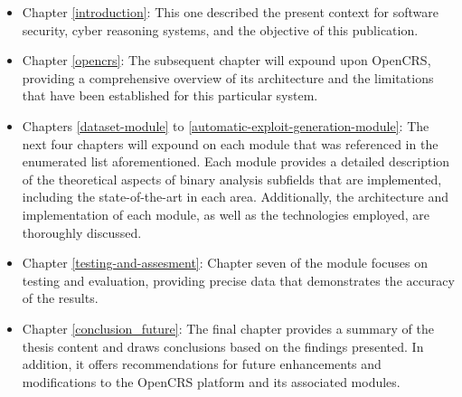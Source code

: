 \documentclass[../main.tex]{subfiles}
\begin{document}
\begin{itemize}
  \item Chapter \ref{introduction}: This one described the present context for software
        security, cyber reasoning systems, and the objective of this publication.
  \item Chapter \ref{opencrs}: The subsequent chapter will expound upon OpenCRS,
        providing a comprehensive overview of its architecture and the limitations that
        have been established for this particular system.
  \item Chapters \ref{dataset-module} to \ref{automatic-exploit-generation-module}: The
        next four chapters will expound on each module that was referenced in the
        enumerated list aforementioned. Each module provides a detailed description of
        the theoretical aspects of binary analysis subfields that are implemented,
        including the state-of-the-art in each area. Additionally, the architecture and
        implementation of each module, as well as the technologies employed, are
        thoroughly discussed.
  \item Chapter \ref{testing-and-assesment}: Chapter seven of the module focuses on
        testing and evaluation, providing precise data that demonstrates the accuracy
        of the results.
  \item Chapter \ref{conclusion_future}: The final chapter provides a summary of the
        thesis content and draws conclusions based on the findings presented. In
        addition, it offers recommendations for future enhancements and modifications
        to the OpenCRS platform and its associated modules.
\end{itemize}
\end{document}
